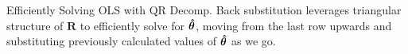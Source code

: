 \documentclass[11pt,compress,t,notes=noshow, xcolor=table]{beamer}
\begin{document}
\begin{vbframe}{Efficiently Solving OLS with QR Decomp.}
Back substitution leverages triangular structure of $\bm{R}$ to efficiently solve for $\bm{\hat{\theta}}$, moving from the last row upwards and substituting previously calculated values of $\bm{\hat{\theta}}$ as we go.

\end{vbframe}

\end{document}
